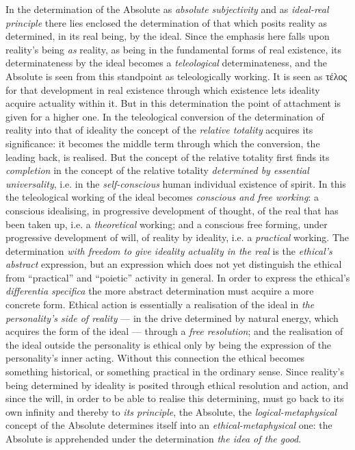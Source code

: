 \documentclass[12pt,a4paper]{book}
\begin{document}
In the determination of the Absolute as \emph{absolute subjectivity} and as
\emph{ideal-real principle} there lies enclosed the determination of that
which posits reality as determined, in its real being, by the ideal. Since the
emphasis here falls upon reality's being \emph{as} reality, as being in
the fundamental forms of real existence, its determinateness by the ideal
becomes a \emph{teleological} determinateness, and the Absolute is seen from
this standpoint as teleologically working. It is seen as τέλος for that
development in real existence through which existence lets ideality acquire
actuality within it. But in this determination the point of attachment is
given for a higher one. In the teleological conversion of the determination of
reality into that of ideality the concept of the \emph{relative totality}
acquires its significance: it becomes the middle term through which the
conversion, the leading back, is realised. But the concept of the relative
totality first finds its \emph{completion} in the concept of the relative
totality \emph{determined by essential universality}, i.e. in the
\emph{self-conscious} human individual existence of spirit. In this the
teleological working of the ideal becomes \emph{conscious and free working}: a
conscious idealising, in progressive development of thought, of the real that
has been taken up, i.e. a \emph{theoretical} working; and a conscious free
forming, under progressive development of will, of reality by ideality, i.e. a
\emph{practical} working. The determination \emph{with freedom to give
ideality actuality in the real} is the \emph{ethical's abstract} expression,
but an expression which does not yet distinguish the ethical from
``practical'' and ``poietic'' activity in general. In order to express the
ethical's \textit{differentia specifica} the more abstract determination must
acquire a more concrete form. Ethical action is essentially a realisation of
the ideal in \emph{the personality's side of reality} --- in the drive
determined by natural energy, which acquires the form of the ideal ---
through a \emph{free resolution}; and the realisation of the ideal outside the
personality is ethical only by being the expression of the personality's inner
acting. Without this connection the ethical becomes something historical, or
something practical in the ordinary sense. Since reality's being determined by
ideality is posited through ethical resolution and action, and since the will,
in order to be able to realise this determining, must go back to its own
infinity and thereby to \emph{its principle}, the Absolute, the
\emph{logical-metaphysical} concept of the Absolute determines itself into an
\emph{ethical-metaphysical} one:
the Absolute is apprehended under the determination \emph{the idea of the
good}.
\end{document}
